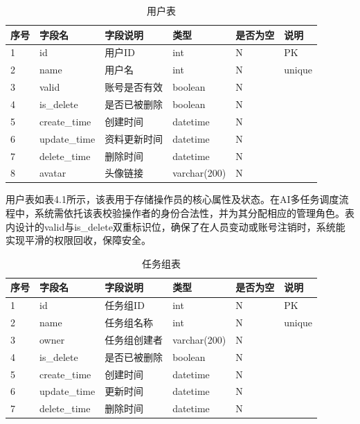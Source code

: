 \begin{table}[htbp]
    \centering
    \caption{用户表}
    \begin{tabular}{llllll}
        \toprule
         序号 & 字段名 & 字段说明 & 类型 & 是否为空 & 说明 \\
         \midrule
            1 & id & 用户ID & int & N & PK\\
            2 & name & 用户名 & int & N & unique\\
            3 & valid & 账号是否有效 & boolean & N & \\
            4 & is\_delete & 是否已被删除 & boolean & N & \\
            5 & create\_time & 创建时间 & datetime & N & \\
            6 & update\_time & 资料更新时间 & datetime & N & \\
            7 & delete\_time & 删除时间 & datetime & N & \\
            8 & avatar & 头像链接 & varchar(200) & N & \\
         \bottomrule
    \end{tabular}
    \label{tab:my_label}
\end{table}

用户表如表4.1所示，该表用于存储操作员的核心属性及状态。在AI多任务调度流程中，系统需依托该表校验操作者的身份合法性，并为其分配相应的管理角色。表内设计的valid与is\_delete双重标识位，确保了在人员变动或账号注销时，系统能实现平滑的权限回收，保障安全。

\begin{table}[htbp]
    \centering
    \caption{任务组表}
    \begin{tabular}{llllll}
        \toprule
        序号 & 字段名 & 字段说明 & 类型 & 是否为空 & 说明 \\
        \midrule
1 & id & 任务组ID & int & N & PK \\
2 & name & 任务组名称 & int & N & unique \\
3 & owner & 任务组创建者 & varchar(200) & N &  \\
4 & is\_delete & 是否已被删除 & boolean & N &  \\
5 & create\_time & 创建时间 & datetime & N &  \\
6 & update\_time & 更新时间 & datetime & N &  \\
7 & delete\_time & 删除时间 & datetime & N &  \\
        \bottomrule
    \end{tabular}
    \label{tab:my_label}
\end{table}

